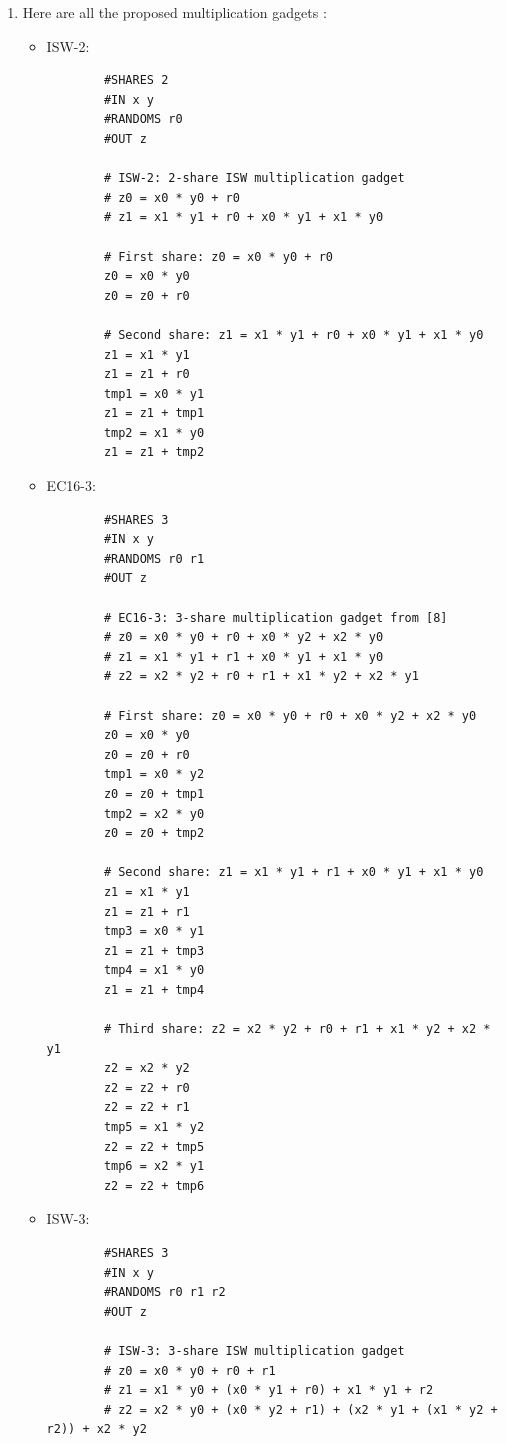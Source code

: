\documentclass{article}
\begin{document}
\begin{enumerate}
  \item Here are all the proposed multiplication gadgets : 
  \begin{itemize}
    \item ISW-2:
      \begin{verbatim}
        #SHARES 2
        #IN x y
        #RANDOMS r0
        #OUT z
    
        # ISW-2: 2-share ISW multiplication gadget
        # z0 = x0 * y0 + r0
        # z1 = x1 * y1 + r0 + x0 * y1 + x1 * y0
    
        # First share: z0 = x0 * y0 + r0
        z0 = x0 * y0
        z0 = z0 + r0
    
        # Second share: z1 = x1 * y1 + r0 + x0 * y1 + x1 * y0
        z1 = x1 * y1
        z1 = z1 + r0
        tmp1 = x0 * y1
        z1 = z1 + tmp1
        tmp2 = x1 * y0
        z1 = z1 + tmp2
      \end{verbatim}
    \item EC16-3:
      \begin{verbatim}
        #SHARES 3
        #IN x y
        #RANDOMS r0 r1
        #OUT z
        
        # EC16-3: 3-share multiplication gadget from [8]
        # z0 = x0 * y0 + r0 + x0 * y2 + x2 * y0
        # z1 = x1 * y1 + r1 + x0 * y1 + x1 * y0  
        # z2 = x2 * y2 + r0 + r1 + x1 * y2 + x2 * y1
        
        # First share: z0 = x0 * y0 + r0 + x0 * y2 + x2 * y0
        z0 = x0 * y0
        z0 = z0 + r0
        tmp1 = x0 * y2
        z0 = z0 + tmp1
        tmp2 = x2 * y0
        z0 = z0 + tmp2
        
        # Second share: z1 = x1 * y1 + r1 + x0 * y1 + x1 * y0
        z1 = x1 * y1
        z1 = z1 + r1
        tmp3 = x0 * y1
        z1 = z1 + tmp3
        tmp4 = x1 * y0
        z1 = z1 + tmp4
        
        # Third share: z2 = x2 * y2 + r0 + r1 + x1 * y2 + x2 * y1
        z2 = x2 * y2
        z2 = z2 + r0
        z2 = z2 + r1
        tmp5 = x1 * y2
        z2 = z2 + tmp5
        tmp6 = x2 * y1
        z2 = z2 + tmp6
      \end{verbatim}
    \item ISW-3:
      \begin{verbatim}
        #SHARES 3
        #IN x y
        #RANDOMS r0 r1 r2
        #OUT z
        
        # ISW-3: 3-share ISW multiplication gadget
        # z0 = x0 * y0 + r0 + r1
        # z1 = x1 * y0 + (x0 * y1 + r0) + x1 * y1 + r2
        # z2 = x2 * y0 + (x0 * y2 + r1) + (x2 * y1 + (x1 * y2 + r2)) + x2 * y2
        

\end{verbatim}
\end{itemize}
\end{enumerate}
\end{document}
